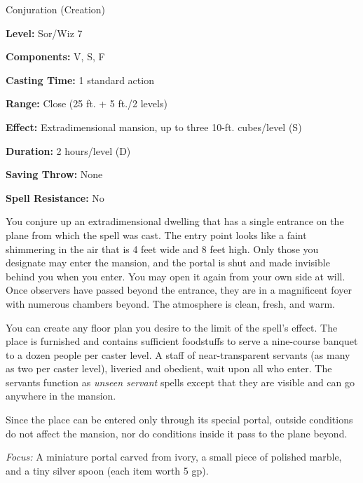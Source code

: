
Conjuration (Creation)

\textbf{Level:} Sor/Wiz 7

\textbf{Components:} V, S, F

\textbf{Casting Time:} 1 standard action

\textbf{Range:} Close (25 ft. + 5 ft./2 levels)

\textbf{Effect:} Extradimensional mansion, up to three 10-ft. cubes/level (S)

\textbf{Duration:} 2 hours/level (D)

\textbf{Saving Throw:} None

\textbf{Spell Resistance:} No

You conjure up an extradimensional dwelling that has a single entrance on the plane 
from which the spell was cast. The entry point looks like a faint shimmering in 
the air that is 4 feet wide and 8 feet high. Only those you designate may enter 
the mansion, and the portal is shut and made invisible behind you when you enter. 
You may open it again from your own side at will. Once observers have passed beyond 
the entrance, they are in a magnificent foyer with numerous chambers beyond. The 
atmosphere is clean, fresh, and warm.

You can create any floor plan you desire to the limit of the spell's effect. The 
place is furnished and contains sufficient foodstuffs to serve a nine-course banquet 
to a dozen people per caster level. A staff of near-transparent servants (as many 
as two per caster level), liveried and obedient, wait upon all who enter. The servants 
function as \textit{unseen servant} spells except that they are visible and can 
go anywhere in the mansion.

Since the place can be entered only through its special portal, outside conditions 
do not affect the mansion, nor do conditions inside it pass to the plane beyond.

\textit{Focus:} A miniature portal carved from ivory, a small piece of polished 
marble, and a tiny silver spoon (each item worth 5 gp).

